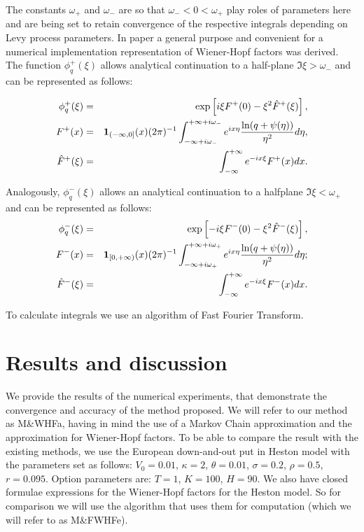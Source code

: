 \documentclass[a4paper]{jpconf}
\begin{document}
The constants $\omega_+$ and $\omega_-$ are so that $\omega_-<0<\omega_+$ play roles of parameters here and are being set to retain convergence of the respective integrals depending on Levy process parameters. In paper \cite{kudr_mex} a general purpose and convenient for a numerical implementation representation of Wiener-Hopf factors was derived. The function $\phi^+_q(\xi)$ allows analytical continuation to a half-plane $\Im \xi>\omega_-$ and can be represented as follows:

\begin{eqnarray*}
	\phi^+_q(\xi)&=&\exp\left[i\xi F^+(0)-\xi^2\hat{F}^+(\xi)\right],\\ 
	F^+(x)&=&{\bf 1}_{(-\infty,0]}(x)(2\pi)^{-1}
	\int_{-\infty+i\omega_-}^{+\infty+i\omega_-}e^{ix\eta}\frac{\ln(q+\psi(\eta))}
	{\eta^2}d\eta,
	\\
	\hat{F}^+(\xi)&=&\int_{-\infty}^{+\infty}e^{-ix\xi}F^+(x)dx.
\end{eqnarray*}

Analogously, $\phi^-_q(\xi)$ allows an analytical continuation to a halfplane $\Im \xi<\omega_+$ and can be represented as follows:
\begin{eqnarray*}
	\phi^-_q(\xi)&=&\exp\left[-i\xi F^-(0)-\xi^2\hat{F}^-(\xi)\right],\\
	F^-(x)&=&{\bf 1}_{[0,+\infty)}(x)(2\pi)^{-1}
	\int_{-\infty+i\omega_+}^{+\infty+i\omega_+}e^{ix\eta}\frac{\ln(q+\psi(\eta))}
	{\eta^2}d\eta;\\
	\hat{F}^-(\xi)&=&\int_{-\infty}^{+\infty}e^{-ix\xi}F^-(x)dx.
\end{eqnarray*}

To calculate integrals we use an algorithm of Fast Fourier Transform.

\section{Results and discussion}

We provide the results of the numerical experiments, that demonstrate the convergence and accuracy of the method proposed. We will refer to our method as M\&WHFa, having in mind the use of a Markov Chain approximation and the approximation for Wiener-Hopf factors. To be able to compare the result with the existing methods, we use the European down-and-out put in Heston model with the parameters set as follows: $V_0=0.01$, $\kappa=2$, $\theta=0.01$, $\sigma=0.2$, $\rho=0.5 $, $r=0.095$. Option parameters are: $T=1$, $K=100$, $H=90$.
We also have closed formulae expressions for the Wiener-Hopf factors for the Heston model. So for comparison we will use the algorithm \cite{kudr_rod} that uses them for computation (which we will refer to as M\&FWHFe).
\end{document}

